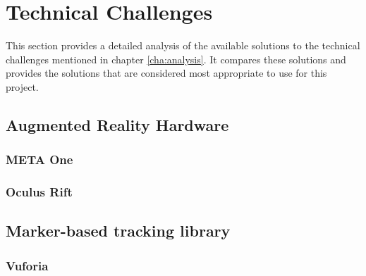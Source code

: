 \chapter{Technical Challenges} \label{cha:technicalchallenges}
	This section provides a detailed analysis of the available solutions to the 
	technical challenges mentioned in chapter \ref{cha:analysis}. It compares
	these solutions and provides the solutions that are considered most 
	appropriate to use for this project.
	
	\section{Augmented Reality Hardware} \label{sec:arhardware}
	
		\subsection{META One} \label{ssec:metaone}
		\subsection{Oculus Rift} \label{ssec:oculusrift}
	
	
	\section{Marker-based tracking library} \label{sec:trackinglib}
	
		\subsection{Vuforia} \label{ssec:vuforia}
